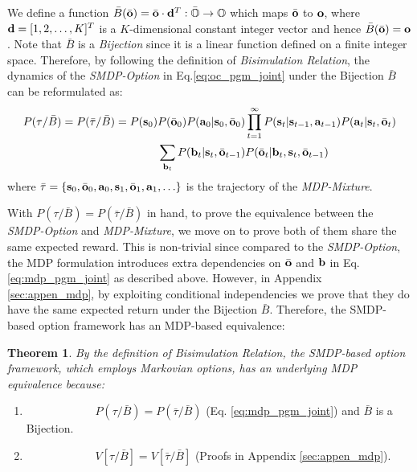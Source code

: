 \documentclass{article}
\newtheorem{thm}{Theorem}[section]
\begin{document}
We define a function
$\bar{B}(\bar{{\mathbf{o}}})=\bar{{\mathbf{o}}}\cdot{\mathbf{d}}^T:\bar{{\mathbb{O}}}\rightarrow{\mathbb{O}}$
which maps $\bar{{\mathbf{o}}}$ to ${\mathbf{o}}$, where ${\mathbf{d}}=[1,2,\dots,K]^T$
is a $K$-dimensional constant integer vector and hence
$\bar{B}(\bar{{\mathbf{o}}})={\mathbf{o}}$. Note that $\bar{B}$ is a
\emph{Bijection} since it is a linear function defined on a
finite integer space. Therefore, by following the definition of
\emph{Bisimulation Relation}, the dynamics of the \emph{SMDP-Option} in
Eq.\ref{eq:oc_pgm_joint} under the Bijection $\bar{B}$ can be
reformulated as:
\begin{align}
  \label{eq:mdp_pgm_joint}
  P(\tau/\bar{B}) = P(\bar{\tau}/\bar{B}) = P({\mathbf{s}}_0)&P(\bar{{\mathbf{o}}}_0)P({\mathbf{a}}_0|{\mathbf{s}}_0,\bar{{\mathbf{o}}}_0)\prod_{t=1}^\infty P({\mathbf{s}}_t|{\mathbf{s}}_{t-1},{\mathbf{a}}_{t-1})P({\mathbf{a}}_{t}|{\mathbf{s}}_{t},\bar{{\mathbf{o}}}_{t})\nonumber\\
                                                     &\sum_{{\mathbf{b}}_t}P({\mathbf{b}}_t|{\mathbf{s}}_t,\bar{{\mathbf{o}}}_{t-1})P(\bar{{\mathbf{o}}}_t|{\mathbf{b}}_t,{\mathbf{s}}_t,\bar{{\mathbf{o}}}_{t-1})
\end{align}
where
$\bar{\tau}=\{{\mathbf{s}}_0,\bar{{\mathbf{o}}}_0,{\mathbf{a}}_0,{\mathbf{s}}_1,\bar{{\mathbf{o}}}_1,{\mathbf{a}}_1,\ldots\}$
is the trajectory of the \emph{MDP-Mixture}.

With $P(\tau/\bar{B}) = P(\bar{\tau}/\bar{B})$ in hand, to prove the
equivalence between the \emph{SMDP-Option} and \emph{MDP-Mixture}, we move on to
prove both of them share the same expected reward. This is
non-trivial since compared to the \emph{SMDP-Option}, the MDP
formulation introduces extra dependencies on $\bar{{\mathbf{o}}}$ and
${\mathbf{b}}$ in Eq.\ref{eq:mdp_pgm_joint} as described above. However,
in Appendix \ref{sec:appen_mdp}, by exploiting conditional
independencies we prove that they do have the same expected
return under the Bijection $\bar{B}$. Therefore, the SMDP-based
option framework has an MDP-based equivalence:
\begin{thm}
  \label{theo:smdp_mdp}
  By the definition of Bisimulation Relation, the SMDP-based
  option framework, which employs Markovian options, has an
  underlying MDP equivalence because:
\end{thm}
\begin{enumerate}
\item
  $\;\;\;\;\;\;\;\;\;\;\;\;\;\;\;\;\;\;\;\;\;\;$$P(\tau/\bar{B})
  = P(\bar{\tau}/\bar{B})$
  (Eq. \ref{eq:mdp_pgm_joint}) and $\bar{B}$ is a Bijection.\\
\item
  $\;\;\;\;\;\;\;\;\;\;\;\;\;\;\;\;\;\;\;\;\;\;$$V[\tau/\bar{B}]=V[\bar{\tau}/\bar{B}]$
  (Proofs in Appendix \ref{sec:appen_mdp}).
\end{enumerate}
\end{document}
